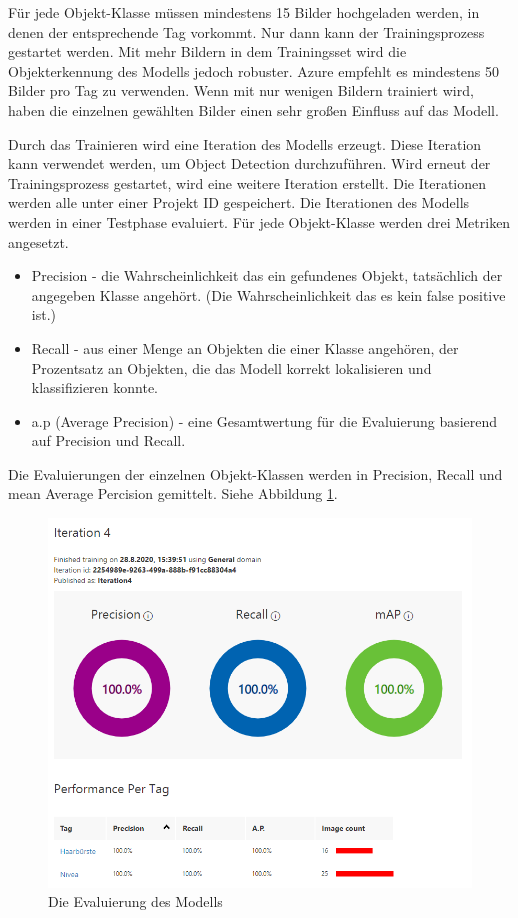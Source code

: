 Für jede Objekt-Klasse müssen mindestens 15 Bilder hochgeladen werden, in denen der entsprechende Tag vorkommt. Nur dann kann der Trainingsprozess gestartet werden. Mit mehr Bildern in dem Trainingsset wird die Objekterkennung des Modells jedoch robuster. Azure empfehlt es mindestens 50 Bilder pro Tag zu verwenden. Wenn mit nur wenigen Bildern trainiert wird, haben die einzelnen gewählten Bilder einen sehr großen Einfluss auf das Modell.

Durch das Trainieren wird eine Iteration des Modells erzeugt. Diese Iteration kann verwendet werden, um Object Detection durchzuführen. Wird erneut der Trainingsprozess gestartet, wird eine weitere Iteration erstellt. Die Iterationen werden alle unter einer Projekt ID gespeichert. Die Iterationen des Modells werden in einer Testphase evaluiert. Für jede Objekt-Klasse werden drei Metriken angesetzt. 
\begin{itemize}
	\item Precision - die Wahrscheinlichkeit das ein gefundenes Objekt, tatsächlich der angegeben Klasse angehört. (Die Wahrscheinlichkeit das es kein false positive ist.)
	\item Recall - aus einer Menge an Objekten die einer Klasse angehören, der Prozentsatz an Objekten, die das Modell korrekt lokalisieren und klassifizieren konnte.
	\item a.p (Average Precision) - eine Gesamtwertung für die Evaluierung basierend auf Precision und Recall. 
\end{itemize}

Die Evaluierungen der einzelnen Objekt-Klassen werden in Precision, Recall und mean Average Percision gemittelt. Siehe Abbildung  \ref{img:trainineval}.

\begin{figure}[H]
	\centering
	\includegraphics[width=1\textwidth]{images/trainingevaluation.png}
	\caption[Evaluierung eines Azure Custom Detection Modells]{Die Evaluierung des Modells}
	\label{img:trainineval}
\end{figure}

